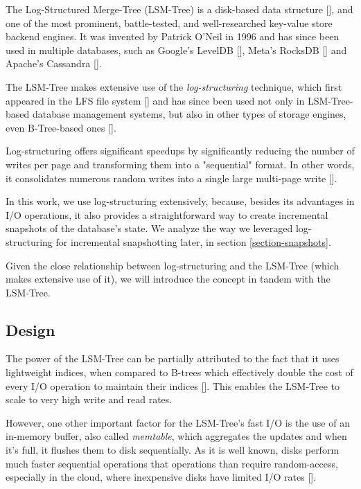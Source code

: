 
The Log-Structured Merge-Tree (LSM-Tree) is a disk-based data structure [\cite{lsmtree}], and one of the most prominent, battle-tested, and well-researched key-value store backend engines.
It was invented by Patrick O'Neil in 1996 and has since been used in multiple databases, such as Google's LevelDB [\cite{leveldb}], Meta's RocksDB [\cite{rocksdb}] and Apache's Cassandra [\cite{cassandra}].

The LSM-Tree makes extensive use of the \textit{log-structuring} technique, which first appeared in the LFS file system [\cite{lsm-filesystem}] and has since been used not only in LSM-Tree-based database management systems, but also in other types of storage engines, even B-Tree-based ones [\cite{llama}].

Log-structuring offers significant speedups by significantly reducing the number of writes per page and transforming them into a "sequential" format.
In other words, it consolidates numerous random writes into a single large multi-page write [\cite{llama}].

In this work, we use log-structuring extensively, because, besides its advantages in I/O operations, it also provides a straightforward way to create incremental snapshots of the database's state.
We analyze the way we leveraged log-structuring for incremental snapshotting later, in section \ref{section-snapshots}.

Given the close relationship between log-structuring and the LSM-Tree (which makes extensive use of it), we will introduce the concept in tandem with the LSM-Tree.

\subsection{Design}
\label{subsection-lsm-design}

The power of the LSM-Tree can be partially attributed to the fact that it uses lightweight indices, when compared to B-trees which effectively double the cost of every I/O operation to maintain their indices [\cite{lsmtree}].
This enables the LSM-Tree to scale to very high write and read rates.

However, one other important factor for the LSM-Tree's fast I/O is the use of an in-memory buffer, also called \textit{memtable}, which aggregates the updates and when it's full, it flushes them to disk sequentially.
As it is well known, disks perform much faster sequential operations that operations than require random-access, especially in the cloud, where inexpensive disks have limited I/O rates [\cite{llama}].

